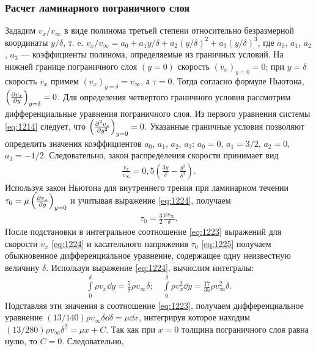 	\subsubsection{Расчет ламинарного пограничного слоя}
	Зададим $v_x/v_\infty$ в виде полинома третьей степени относительно безразмерной координаты $y/\delta$, т. e. $v_x/v_\infty = a_0 + a_1y/\delta + a_2\left(y/\delta\right)^2 + a_3\left(y/\delta\right)^3$, где $a_0$, $a_1$, $a_2$, $a_3$ --- коэффициенты полинома, определяемые из граничных условий.\n
	На нижней границе пограничного слоя $\left(y = 0\right)$ скорость $\left(v_x\right)_{y=0} = 0$; при $y = \delta$ скорость $v_x$ примем $\left(v_x\right)_{y=\delta} = v_\infty$, а $\tau = 0$. Тогда согласно формуле Ньютона, $\left(\frac{\partial v_x}{\partial y}\right)_{y=\delta} = 0$.\n
	Для определения четвертого граничного условия рассмотрим дифференциальные уравнения пограничного слоя. Из первого уравнения системы \eqref{eq:1214} следует, что $\left(\frac{\partial^2 v_x}{\partial y^2}\right)_{y=0} = 0$.\n
	Указанные граничные условия позволяют определить значения коэффициентов $a_0$, $a_1$, $a_2$, $a_3$: $a_0 = 0$, $a_1 = 3/2$, $a_2 = 0$, $a_3 = -1/2$.\n
	Следовательно, закон распределения скорости принимает вид
	\begin{gather}\label{eq:1224}
		\frac{v_x}{v_\infty} = 0,5\left(\frac{3y}{\delta} - \frac{y^3}{\delta^3}\right).
	\end{gather}\n
	Используя закон Ньютона для внутреннего трения при ламинарном течении $\tau_0 = \mu\left(\frac{\partial v_x}{\partial y}\right)_{y=0}$ и учитывая выражение \eqref{eq:1224}, получаем
	\begin{gather}\label{eq:1225}
		\tau_0 = \frac{3}{2}\frac{\mu v_\infty}{\delta}.
	\end{gather}\n
	После подстановки в интегральное соотношение \eqref{eq:1223} выражений для скорости $v_x$ \eqref{eq:1224} и касательного напряжения $\tau_0$ \eqref{eq:1225} получаем обыкновенное дифференциальное уравнение, содержащее одну неизвестную величину $\delta$.\n
	Используя выражение \eqref{eq:1224}, вычислим интегралы:
	\begin{gather*}
		\int\limits_0^\delta\rho v_x\dd y = \frac{5}{8}\rho v_\infty\delta; \quad
		\int\limits_0^\delta\rho v_x^2\dd y = \frac{17}{35}\rho v_\infty^2\delta.
	\end{gather*}\n
	Подставляя эти значения в соотношение \eqref{eq:1223}, получаем дифференциальное уравнение $\left(13/140\right)\rho v_\infty\delta\dd\delta = \mu\dd x$, интегрируя которое находим $\left(13/280\right)\rho v_\infty\delta^2 = \mu x + C$. Так как при $x = 0$ толщина пограничного слоя равна нулю, то $C = 0$. Следовательно,
